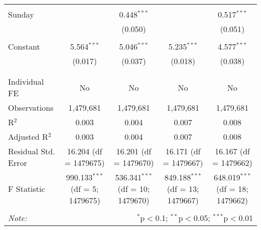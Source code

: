 \documentclass[
]{article}
\begin{document}
\begin{table}[!htbp]
{\begin{tabular}{@{\extracolsep{5pt}}lcccc}
  & & & & \\ 
 Sunday &  & 0.448$^{***}$ &  & 0.517$^{***}$ \\ 
  &  & (0.050) &  & (0.051) \\ 
  & & & & \\ 
 Constant & 5.564$^{***}$ & 5.046$^{***}$ & 5.235$^{***}$ & 4.577$^{***}$ \\ 
  & (0.017) & (0.037) & (0.018) & (0.038) \\ 
  & & & & \\ 
\hline \\[-1.8ex] 
Individual FE & No & No & No & No \\ 
Observations & 1,479,681 & 1,479,681 & 1,479,681 & 1,479,681 \\ 
R$^{2}$ & 0.003 & 0.004 & 0.007 & 0.008 \\ 
Adjusted R$^{2}$ & 0.003 & 0.004 & 0.007 & 0.008 \\ 
Residual Std. Error & 16.204 (df = 1479675) & 16.201 (df = 1479670) & 16.171 (df = 1479667) & 16.167 (df = 1479662) \\ 
F Statistic & 990.133$^{***}$ (df = 5; 1479675) & 536.341$^{***}$ (df = 10; 1479670) & 849.188$^{***}$ (df = 13; 1479667) & 648.019$^{***}$ (df = 18; 1479662) \\ 
\hline 
\hline \\[-1.8ex] 
\textit{Note:}  & \multicolumn{4}{r}{$^{*}$p$<$0.1; $^{**}$p$<$0.05; $^{***}$p$<$0.01} \\ 
\end{tabular}
} 
\end{table} 
\newpage
\end{document}
